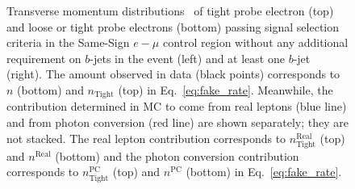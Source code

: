\begin{figure}[ht!]
{}
\vspace{-10mm}\caption{Transverse momentum distributions \pt\ of tight 
probe electron (top) and loose or tight probe electrons (bottom) passing 
signal selection criteria in the Same-Sign $e-\mu$ control region 
without any additional requirement on $b$-jets in the event (left) and 
at least one $b$-jet (right).
The amount observed in data (black points) corresponds 
to $n$ (bottom) and $n_{\textrm{Tight}}$ (top) in Eq.~\ref{eq:fake_rate}. 
Meanwhile, the contribution determined in MC to come from 
real leptons (blue line) and from photon conversion (red line) are shown 
separately; they are not stacked. The real lepton contribution corresponds to 
$n_{\textrm{Tight}}^{\textrm{Real}}$ (top) and $n^{\textrm{Real}}$ (bottom) 
and the photon conversion 
contribution corresponds 
to $n_{\textrm{Tight}}^{\textrm{PC}}$ (top) 
and $n^{\textrm{PC}}$ (bottom) in Eq.~\ref{eq:fake_rate}.  }
\label{fig:fakeEff_CRs_electron}
\end{figure}

